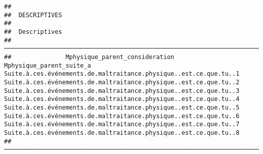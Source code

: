 \documentclass[
]{article}
\begin{document}
\begin{verbatim}
## 
##  DESCRIPTIVES
## 
##  Descriptives                                                                                                                                                                                                                                                                                                                                                                                                                                                                                                                                                                                                                                      
##  ───────────────────────────────────────────────────────────────────────────────────────────────────────────────────────────────────────────────────────────────────────────────────────────────────────────────────────────────────────────────────────────────────────────────────────────────────────────────────────────────────────────────────────────────────────────────────────────────────────────────────────────────────────────────────────────────────────────────────────────────────────────────────────────────────────────────────────────────────────────────────────────────────────────────────────────────────────────────── 
##               Mphysique_parent_consideration    Mphysique_parent_suite_a    Suite.à.ces.événements.de.maltraitance.physique..est.ce.que.tu..1    Suite.à.ces.événements.de.maltraitance.physique..est.ce.que.tu..2    Suite.à.ces.événements.de.maltraitance.physique..est.ce.que.tu..3    Suite.à.ces.événements.de.maltraitance.physique..est.ce.que.tu..4    Suite.à.ces.événements.de.maltraitance.physique..est.ce.que.tu..5    Suite.à.ces.événements.de.maltraitance.physique..est.ce.que.tu..6    Suite.à.ces.événements.de.maltraitance.physique..est.ce.que.tu..7    Suite.à.ces.événements.de.maltraitance.physique..est.ce.que.tu..8   
##  ───────────────────────────────────────────────────────────────────────────────────────────────────────────────────────────────────────────────────────────────────────────────────────────────────────────────────────────────────────────────────────────────────────────────────────────────────────────────────────────────────────────────────────────────────────────────────────────────────────────────────────────────────────────────────────────────────────────────────────────────────────────────────────────────────────────────────────────────────────────────────────────────────────────────────────────────────────────────── 

\end{verbatim}
\end{document}
